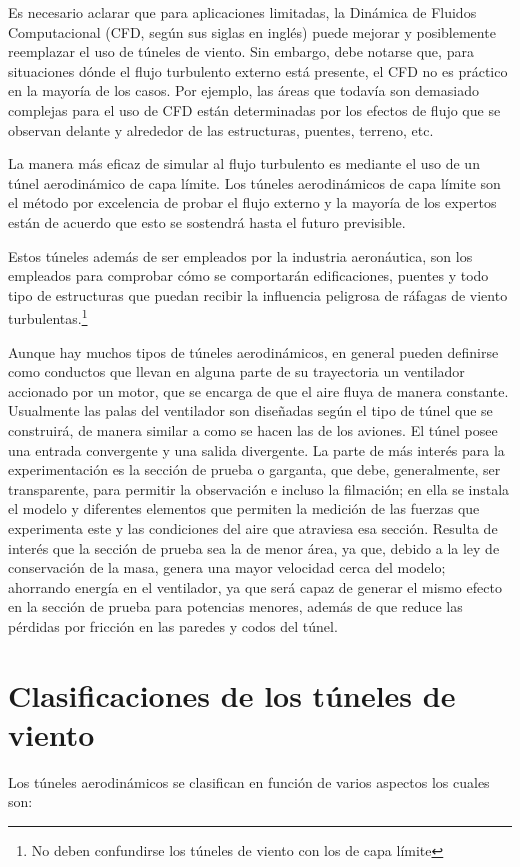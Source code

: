 \documentclass[10pt,a4paper]{article}
\begin{document}
Es necesario aclarar que para aplicaciones limitadas, la Dinámica de Fluidos Computacional (CFD, según sus siglas en inglés) puede mejorar y posiblemente reemplazar el uso de túneles de viento. Sin embargo, debe notarse que, para situaciones dónde el flujo turbulento externo está presente, el CFD no es práctico en la mayoría de los casos. Por ejemplo, las áreas que todavía son demasiado complejas para el uso de CFD están determinadas por los efectos de flujo que se observan delante y alrededor de las estructuras, puentes, terreno, etc.

La manera más eficaz de simular al flujo turbulento es mediante el uso de un túnel aerodinámico de capa límite. Los túneles aerodinámicos de capa límite son el método por excelencia de probar el flujo externo y la mayoría de los expertos están de acuerdo que esto se sostendrá hasta el futuro previsible.

Estos túneles además de ser empleados por la industria aeronáutica, son los empleados para comprobar cómo se comportarán edificaciones, puentes y todo tipo de estructuras que puedan recibir la influencia peligrosa de ráfagas de viento turbulentas.\footnote{No deben confundirse los túneles de viento con los de capa límite}

Aunque hay muchos tipos de túneles aerodinámicos, en general pueden definirse como conductos que llevan en alguna parte de su trayectoria un ventilador accionado por un motor, que se encarga de que el aire fluya de manera constante. Usualmente las palas del ventilador son diseñadas según el tipo de túnel que se construirá, de manera similar a como se hacen las de los aviones. El túnel posee una entrada convergente y una salida divergente. La parte de más interés para la experimentación es la sección de prueba o garganta, que debe, generalmente, ser transparente, para permitir la observación e incluso la filmación; en ella se instala el modelo y diferentes elementos que permiten la medición de las fuerzas que experimenta este y las condiciones del aire que atraviesa esa sección. Resulta de interés que la sección de prueba sea la de menor área, ya que, debido a la ley de conservación de la masa, genera una mayor velocidad cerca del modelo; ahorrando energía en el ventilador, ya que será capaz de generar el mismo efecto en la sección de prueba para potencias menores, además de que reduce las pérdidas por fricción en las paredes y codos del túnel.

\section{Clasificaciones de los túneles de viento}
Los túneles aerodinámicos se clasifican en función de varios aspectos los cuales son:
\end{document}
